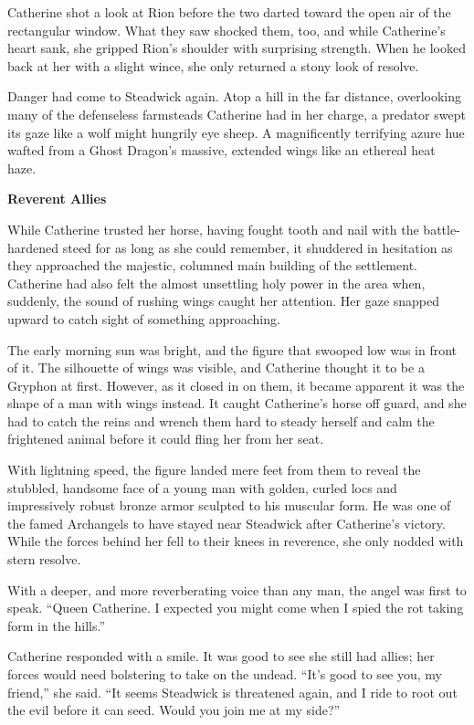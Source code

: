 \begin{multicols*}{2}
Catherine shot a look at Rion before the two darted toward the open air of the rectangular window.
What they saw shocked them, too, and while Catherine's heart sank, she gripped Rion's shoulder with surprising strength.
When he looked back at her with a slight wince, she only returned a stony look of resolve.

Danger had come to Steadwick again.
Atop a hill in the far distance, overlooking many of the defenseless farmsteads Catherine had in her charge, a predator swept its gaze like a wolf might hungrily eye sheep.
A magnificently terrifying azure hue wafted from a Ghost Dragon's massive, extended wings like an ethereal heat haze.

\textbf{Reverent Allies}

While Catherine trusted her horse, having fought tooth and nail with the battle-hardened steed for as long as she could remember, it shuddered in hesitation as they approached the majestic, columned main building of the settlement.
Catherine had also felt the almost unsettling holy power in the area when, suddenly, the sound of rushing wings caught her attention.
Her gaze snapped upward to catch sight of something approaching.

The early morning sun was bright, and the figure that swooped low was in front of it.
The silhouette of wings was visible, and Catherine thought it to be a Gryphon at first.
However, as it closed in on them, it became apparent it was the shape of a man with wings instead.
It caught Catherine's horse off guard, and she had to catch the reins and wrench them hard to steady herself and calm the frightened animal before it could fling her from her seat.

With lightning speed, the figure landed mere feet from them to reveal the stubbled, handsome face of a young man with golden, curled locs and impressively robust bronze armor sculpted to his muscular form.
He was one of the famed Archangels to have stayed near Steadwick after Catherine's victory.
While the forces behind her fell to their knees in reverence, she only nodded with stern resolve.

With a deeper, and more reverberating voice than any man, the angel was first to speak.
``Queen Catherine.
I expected you might come when I spied the rot taking form in the hills.''

Catherine responded with a smile.
It was good to see she still had allies; her forces would need bolstering to take on the undead.
``It's good to see you, my friend,'' she said.
``It seems Steadwick is threatened again, and I ride to root out the evil before it can seed.
Would you join me at my side?''


\end{multicols*}
